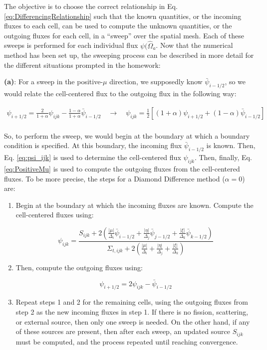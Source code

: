 \documentclass[10pt]{article}
\begin{document}
The objective is to choose the correct relationship in Eq. \eqref{eq:DifferencingRelationship} such that the known quantities, or the incoming fluxes to each cell, can be used to compute the unknown quantities, or the outgoing fluxes for each cell, in a ``sweep'' over the spatial mesh. Each of these sweeps is performed for each individual flux \(\psi(\hat{\Omega}_a\). Now that the numerical method has been set up, the sweeping process can be described in more detail for the different situations prompted in the homework:\newline

\textbf{(a)}: For a sweep in the positive-\(\mu\) direction, we supposedly know \(\bar{\psi}_{i-1/2}\), so we would relate the cell-centered flux to the outgoing flux in the following way:

\begin{equation}
\label{eq:PositiveMu}
\begin{aligned}
\psi_{i+1/2}=\frac{2}{1+\alpha}\psi_{ijk}-\frac{1-\alpha}{1+\alpha}\bar{\psi}_{i-1/2}\quad\rightarrow\quad\psi_{ijk}=\frac{1}{2}\left\lbrack(1+\alpha)\psi_{i+1/2}+(1-\alpha)\bar{\psi}_{i-1/2}\right\rbrack\\
\end{aligned}
\end{equation}

So, to perform the sweep, we would begin at the boundary at which a boundary condition is specified. At this boundary, the incoming flux \(\bar{\psi}_{i-1/2}\) is known. Then, Eq. \eqref{eq:psi_ijk} is used to determine the cell-centered flux \(\psi_{ijk}\). Then, finally, Eq. \eqref{eq:PositiveMu} is used to compute the outgoing fluxes from the cell-centered fluxes. To be more precise, the steps for a Diamond Difference method (\(\alpha=0\)) are:

\begin{enumerate}
\item Begin at the boundary at which the incoming fluxes are known. Compute the cell-centered fluxes using:

\begin{equation}
\psi_{ijk}=\frac{S_{ijk}+2\left(\frac{|\mu|}{\Delta_i}\bar{\psi}_{i-1/2}+\frac{|\eta|}{\Delta_j}\bar{\psi}_{j-1/2}+\frac{|\xi|}{\Delta_k}\bar{\psi}_{k-1/2}\right)}{\Sigma_{t,ijk}+2\left(\frac{|\mu|}{\Delta_i}+\frac{|\eta|}{\Delta_j}+\frac{|\xi|}{\Delta_k}\right)}
\end{equation}

\item Then, compute the outgoing fluxes using:

\begin{equation}
\psi_{i+1/2}=2\psi_{ijk}-\bar{\psi}_{i-1/2}
\end{equation}

\item Repeat steps 1 and 2 for the remaining cells, using the outgoing fluxes from step 2 as the new incoming fluxes in step 1. If there is no fission, scattering, or external source, then only one sweep is needed. On the other hand, if any of these sources are present, then after each sweep, an updated source \(S_{ijk}\) must be computed, and the process repeated until reaching convergence.
\end{enumerate}
\end{document}
